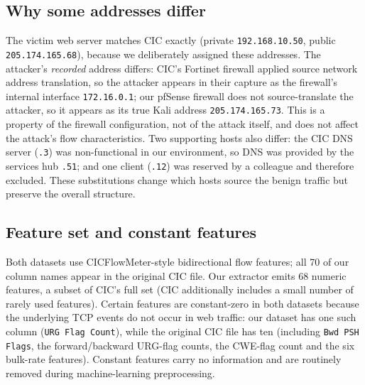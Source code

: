 \documentclass[11pt]{article}
\begin{document}
\subsection{Why some addresses differ}
\label{sec:addrdiff}
The victim web server matches CIC exactly (private \texttt{192.168.10.50}, public
\texttt{205.174.165.68}), because we deliberately assigned these addresses. The
attacker's \emph{recorded} address differs: CIC's Fortinet firewall applied
source network address translation, so the attacker appears in their capture as
the firewall's internal interface \texttt{172.16.0.1}; our pfSense firewall does
not source-translate the attacker, so it appears as its true Kali address
\texttt{205.174.165.73}. This is a property of the firewall configuration, not of
the attack itself, and does not affect the attack's flow characteristics. Two
supporting hosts also differ: the CIC DNS server (\texttt{.3}) was non-functional
in our environment, so DNS was provided by the services hub \texttt{.51}; and one
client (\texttt{.12}) was reserved by a colleague and therefore excluded. These
substitutions change which hosts source the benign traffic but preserve the
overall structure.

\subsection{Feature set and constant features}
Both datasets use CICFlowMeter-style bidirectional flow features; all 70 of our
column names appear in the original CIC file. Our extractor emits 68 numeric
features, a subset of CIC's full set (CIC additionally includes a small number of
rarely used features). Certain features are constant-zero in both datasets
because the underlying TCP events do not occur in web traffic: our dataset has
one such column (\texttt{URG Flag Count}), while the original CIC file has ten
(including \texttt{Bwd PSH Flags}, the forward/backward URG-flag counts, the
CWE-flag count and the six bulk-rate features). Constant features carry no
information and are routinely removed during machine-learning preprocessing.
\end{document}
